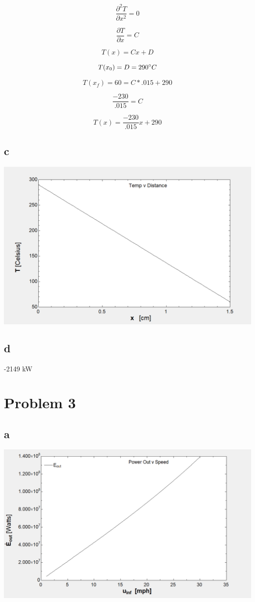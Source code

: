 \documentclass[]{report}
\begin{document}
$$ \frac{\partial^{2} {T}}{\partial{x}^{2}} = 0 $$

$$  \frac{\partial {T}}{\partial{x}} = C  $$

$$ T(x) = Cx + D $$


$$ T(x_0) = D = 290{\degree} C $$

$$ T(x_f) = 60 = C * .015 + 290 $$

$$ \frac{-230}{.015} = C $$

$$ T(x) = \frac{-230}{.015} x + 290 $$


\subsection{c}

\begin{center}
	\includegraphics[width=0.7\linewidth]{"../2-graph"}
\end{center}

\subsection{d}

\begin{Center}
	-2149 kW
\end{Center}

\section{Problem 3}

\subsection{a}

\begin{center}
	\includegraphics[width=0.7\linewidth]{"../3.a-graph"}
\end{center}
\end{document}

